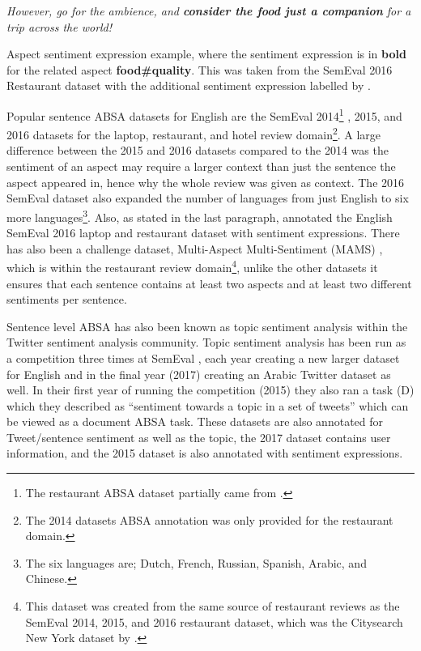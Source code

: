 \begin{example}
\textit{However, go for the ambience, and \textbf{consider the food just a companion} for a trip across the world!}
\caption{Aspect sentiment expression example, where the sentiment expression is in \textbf{bold} for the related aspect \textbf{food\#quality}. This was taken from the SemEval 2016 Restaurant dataset \citep{pontiki-etal-2016-semeval} with the additional sentiment expression labelled by \citet{kaljahi-foster-2018-sentiment}.}
\label{example:lit_review_sentence_aspect_sentiment_expression}
\end{example}

Popular sentence ABSA datasets for English are the SemEval 2014\footnote{The restaurant ABSA dataset partially came from \citet{Ganu2009BeyondTS}.} \citep{pontiki-etal-2014-semeval}, 2015\citep{pontiki-etal-2015-semeval}, and 2016 \citep{pontiki-etal-2016-semeval} datasets for the laptop, restaurant, and hotel review domain\footnote{The 2014 datasets ABSA annotation was only provided for the restaurant domain.}. A large difference between the 2015 and 2016 datasets compared to the 2014 was the sentiment of an aspect may require a larger context than just the sentence the aspect appeared in, hence why the whole review was given as context. The 2016 SemEval dataset also expanded the number of languages from just English to six more languages\footnote{The six languages are; Dutch, French, Russian, Spanish, Arabic, and Chinese.}. Also, as stated in the last paragraph, \citet{kaljahi-foster-2018-sentiment} annotated the English SemEval 2016 laptop and restaurant dataset with sentiment expressions. There has also been a challenge dataset, Multi-Aspect Multi-Sentiment (MAMS) \citep{jiang-etal-2019-challenge}, which is within the restaurant review domain\footnote{This dataset was created from the same source of restaurant reviews as the SemEval 2014, 2015, and 2016 restaurant dataset, which was the Citysearch New York dataset by \citet{Ganu2009BeyondTS}.}, unlike the other datasets it ensures that each sentence contains at least two aspects and at least two different sentiments per sentence.

Sentence level ABSA has also been known as topic sentiment analysis within the Twitter sentiment analysis community. Topic sentiment analysis has been run as a competition three times at SemEval \citep{rosenthal-etal-2015-semeval, nakov-etal-2016-semeval, rosenthal-etal-2017-semeval}, each year creating a new larger dataset for English and in the final year (2017) creating an Arabic Twitter dataset as well. In their first year of running the competition (2015) they also ran a task (D) which they described as ``sentiment towards a topic in a set of tweets'' which can be viewed as a document ABSA task. These datasets are also annotated for Tweet/sentence sentiment as well as the topic, the 2017 dataset contains user information, and the 2015 dataset is also annotated with sentiment expressions.

